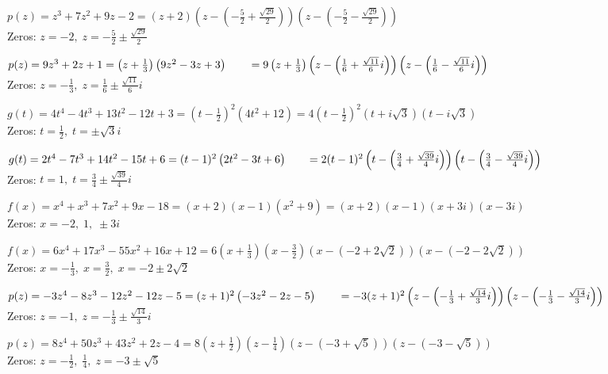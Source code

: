 \begin{exenum}
\item  $p(z) = z^3 + 7z^2+9z-2 = (z+2) \left(z - \left( -\frac{5}{2}+\frac{\sqrt{29}}{2}\right) \right) \left(z - \left( -\frac{5}{2}-\frac{\sqrt{29}}{2}\right) \right)$ \\
Zeros:  $z = -2, \; z = -\frac{5}{2} \pm \frac{\sqrt{29}}{2}$
\item  $p(z) = 9z^3+2z+1 = \left(z + \frac{1}{3}\right) \left(9z^2 - 3z + 3\right) \\
\phantom{f(z)}= 9\left(z + \frac{1}{3}\right) \left(z - \left(\frac{1}{6} + \frac{\sqrt{11}}{6} i \right) \right) \left(z - \left(\frac{1}{6} - \frac{\sqrt{11}}{6} i \right) \right)$\\
Zeros:  $z = -\frac{1}{3}, \; z = \frac{1}{6} \pm \frac{\sqrt{11}}{6} i$

\item $g(t) = 4t^{4} - 4t^{3} + 13t^{2} - 12t + 3 = \left(t - \frac{1}{2}\right)^{2}\left(4t^{2} + 12\right) = 4\left(t - \frac{1}{2}\right)^{2}(t + i\sqrt{3})(t - i\sqrt{3})$\\
Zeros: $t = \frac{1}{2}, \; t = \pm \sqrt{3}i$
\item $g(t) = 2t^4-7t^3+14t^2-15t+6 = (t-1)^2 \left(2t^2 - 3t + 6\right)  \\
\phantom{f(t)} = 2 (t-1)^2 \left( t - \left( \frac{3}{4} +  \frac{\sqrt{39}}{4} i \right) \right)  \left( t - \left( \frac{3}{4} -  \frac{\sqrt{39}}{4} i \right) \right) $ \\
Zeros: $t = 1, \; t = \frac{3}{4}  \pm  \frac{\sqrt{39}}{4} i$

\item  $f(x) = x^4+x^3+7x^2+9x-18 = (x+2)(x-1)\left(x^2+9\right) = (x+2)(x-1)(x+3i)(x-3i)$\\
Zeros:  $x = -2, \; 1, \; \pm 3i$
\item  $f(x) = 6x^4+17x^3-55x^2+16x+12 = 6 \left(x + \frac{1}{3} \right) \left(x - \frac{3}{2} \right) \left(x - \left( -2 + 2 \sqrt{2}\right)\right) \left(x - \left( -2 - 2 \sqrt{2}\right)\right)$ \\
Zeros:  $x = -\frac{1}{3}, \; x = \frac{3}{2}, \; x = -2 \pm 2 \sqrt{2}$

\item  $p(z) = -3z^4-8z^3-12z^2-12z-5 = (z+1)^2 \left(-3z^2-2z-5\right) \\
\phantom{f(z)}= -3(z+1)^2\left(z - \left( -\frac{1}{3}+\frac{\sqrt{14}}{3} i\right) \right) \left(z - \left( -\frac{1}{3}-\frac{\sqrt{14}}{3} i\right) \right)$ \\
Zeros:  $z = -1, \; z = -\frac{1}{3} \pm \frac{\sqrt{14}}{3} i$
\item  $p(z) = 8z^4+50z^3+43z^2+2z-4 = 8\left(z + \frac{1}{2}\right) \left(z - \frac{1}{4}\right)(z - (-3 + \sqrt{5}))(z - (-3 - \sqrt{5}))$ \\
Zeros:  $z = -\frac{1}{2}, \; \frac{1}{4}, \; z = -3 \pm \sqrt{5}$


\end{exenum}

